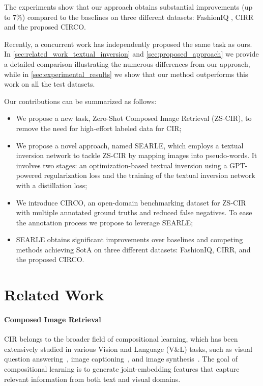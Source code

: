 \documentclass[10pt,twocolumn,letterpaper]{article}
\newcommand{\method}{SEARLE\xspace}
\begin{document}
The experiments show that our approach obtains substantial improvements (up to 7\%) compared to the baselines on three different datasets: FashionIQ \cite{wu2021fashion}, CIRR \cite{liu2021image} and the proposed CIRCO.

Recently, a concurrent work \cite{saito2023pic2word} has independently proposed the same task as ours. In \cref{sec:related_work_textual_inversion} and \cref{sec:proposed_approach} we provide a detailed comparison illustrating the numerous differences from our approach, while in \cref{sec:experimental_results} we show that our method outperforms this work on all the test datasets.

Our contributions can be summarized as follows:
\vspace{-3pt}
\begin{itemize}
    \item We propose a new task, Zero-Shot Composed Image Retrieval (ZS-CIR), to remove the need for high-effort labeled data for CIR;
    \vspace{-3pt}
    \item We propose a novel approach, named \method, which employs a textual inversion network to tackle ZS-CIR by mapping images into pseudo-words. It involves two stages: an optimization-based textual inversion using a GPT-powered regularization loss and the training of the textual inversion network with a distillation loss;
    \vspace{-3pt} 
    \item We introduce CIRCO, an open-domain benchmarking dataset for ZS-CIR with multiple annotated ground truths and reduced false negatives. To ease the annotation process we propose to leverage \method;
    \vspace{-3pt}
    \item \method obtains significant improvements over baselines and competing methods achieving SotA on three different datasets: FashionIQ, CIRR, and the proposed CIRCO.
\end{itemize}



\section{Related Work}

\paragraph{Composed Image Retrieval} CIR belongs to the broader field of compositional learning, which has been extensively studied in various Vision and Language (V\&L) tasks, such as visual question answering~\cite{antol2015vqa}, image captioning~\cite{cornia2020meshed, hu2022scaling}, and image synthesis~\cite{rombach2022high, sahariaphotorealistic}. The goal of compositional learning is to generate joint-embedding features that capture relevant information from both text and visual domains.
\end{document}
